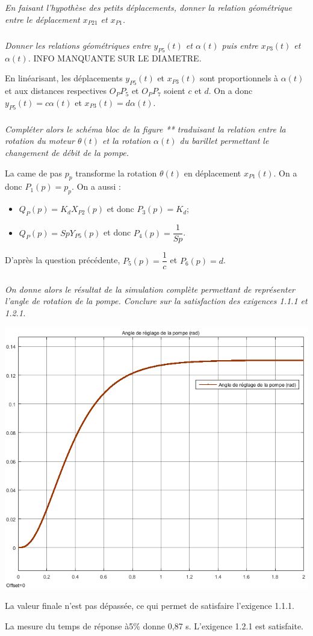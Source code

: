 \documentclass[10pt,fleqn]{article} %
\begin{document}
\begin{multicols}{2}
\subparagraph{}
\textit{En faisant l'hypothèse des petits déplacements, donner la relation géométrique entre le déplacement $x_{P21}$ et $x_{P1}$.}
\begin{corrige}

\end{corrige}

\subparagraph{}
\textit{Donner les relations géométriques entre $y_{P5}(t)$ et $\alpha(t)$ puis entre $x_{P3}(t)$ et $\alpha(t)$.}
INFO MANQUANTE SUR LE DIAMETRE.
\begin{corrige}
En linéarisant, les déplacements $y_{P5}(t)$ et $x_{P3}(t)$ sont proportionnels à $\alpha(t)$ et aux distances respectives $O_PP_5$ et $O_PP_7$ soient $c$ et $d$. 
On a donc $y_{P5}(t)=c\alpha(t)$ et $x_{P3}(t)=d \alpha(t)$.

\end{corrige}

\subparagraph{}
\textit{Compléter alors le schéma bloc de la figure ** traduisant la relation entre la rotation du moteur $\theta(t)$ et la rotation $\alpha(t)$ du barillet permettant le changement de débit de la pompe.}
\begin{corrige}
La came de pas $p_p$ transforme la rotation $\theta(t)$ en déplacement $x_{P1}(t)$. 
On a donc $P_1(p)=p_p$.
On a aussi :
\begin{itemize}
\item $Q_P(p) = K_d X_{P2}(p)$ et donc $P_3(p)=K_d$;
\item $Q_{P}(p) = Sp Y_{P5}(p)$ et donc $P_4(p)=\dfrac{1}{Sp}$.
\end{itemize}
D'après la question précédente, $P_5(p)=\dfrac{1}{c}$ et $P_6(p)=d$.
\end{corrige}


\subparagraph{}
\textit{On donne alors le résultat de la simulation complète permettant de représenter l'angle de rotation de la pompe. Conclure sur la satisfaction des exigences 1.1.1 et 1.2.1.}

\begin{center}
\includegraphics[width=.45\textwidth]{images/simu_2}
\end{center}

\begin{corrige}
La valeur finale n'est pas dépassée, ce qui permet de satisfaire l'exigence 1.1.1. 

La mesure du temps de réponse à5\% donne 0,87 s. L'exigence 1.2.1 est satisfaite.
\end{corrige}


\end{multicols}
\end{document}
